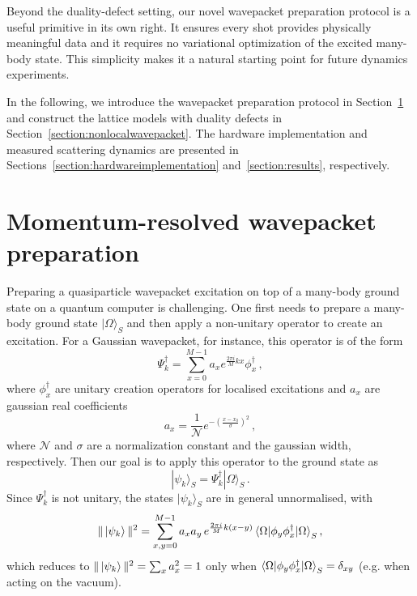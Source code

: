 Beyond the duality-defect setting, our novel wavepacket preparation protocol is a useful primitive in its own right. It ensures every shot provides physically meaningful data and it requires no variational optimization of the excited many-body state. This simplicity makes it a natural starting point for future dynamics experiments.

In the following, we introduce the wavepacket preparation protocol in Section~\ref{section:localized_wavepacket} and construct the lattice models with duality defects in Section~\ref{section:nonlocalwavepacket}. The hardware implementation and measured scattering dynamics are presented in Sections~\ref{section:hardwareimplementation} and~\ref{section:results}, respectively.

\section{Momentum-resolved wavepacket preparation}
\label{section:localized_wavepacket}
Preparing a quasiparticle wavepacket excitation on top of a many-body ground state on a quantum computer is challenging. One first needs to prepare a many-body ground state $|\Omega\rangle_S$ and then apply a non-unitary operator to create an excitation. For a Gaussian wavepacket, for instance, this operator is of the form
\begin{equation}
    \Psi_k^{\dagger} = \sum_{x=0}^{M-1} a_xe^{\frac{2\pi i}{M}kx} \phi^{\dagger}_x\,,
\end{equation}
where $\phi^{\dagger}_x$ are unitary creation operators for localised excitations and $a_x$ are gaussian real coefficients 
$$a_x=\frac{1}{\mathcal{N}}e^{-\left(\frac{x-x_0}{\sigma}\right)^2}\,,$$
where $\mathcal{N}$ and $\sigma$ are a normalization constant and the gaussian width, respectively. Then our goal is to apply this operator to the ground state as 
$$|\psi_k\rangle_S = \Psi_k^{\dagger}|\Omega\rangle_S\,.$$
Since $\Psi_k^\dagger$ is not unitary, the states $|\psi_k\rangle_S$ are in general unnormalised, with
\begin{equation}
\| \ket{\psi_k} \|^2 = \sum_{x,y=0}^{M-1} a_x a_y\, e^{\frac{2\pi i}{M}k(x-y)} \braket{\Omega | \phi_y \phi_x^\dagger | \Omega}_S ,
\end{equation}
which reduces to $\| \ket{\psi_k} \|^2 =\sum_x a_x^2 = 1$ only when $\braket{\Omega | \phi_y \phi_x^\dagger | \Omega}_S = \delta_{xy}$ (e.g. when acting on the vacuum). 

